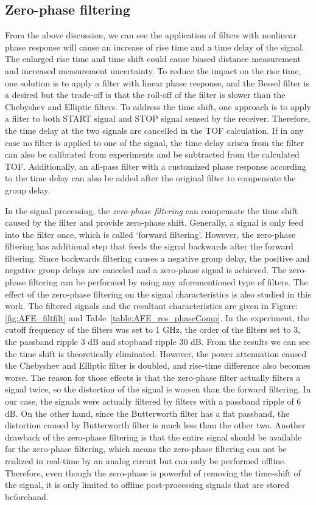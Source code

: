 \subsection{Zero-phase filtering}
From the above discussion, we can see the application of filters with nonlinear phase response will cause an increase of rise time and a time delay of the signal. The enlarged rise time and time shift could cause biased distance measurement and increased measurement uncertainty. To reduce the impact on the rise time, one solution is to apply a filter with linear phase response, and the Bessel filter is a desired but the trade-off is that the roll-off of the filter is slower than the Chebyshev and Elliptic filters. To address the time shift, one approach is to apply a filter to both START signal and STOP signal sensed by the receiver. Therefore, the time delay at the two signals are cancelled in the TOF calculation. If in any case no filter is applied to one of the signal, the time delay arisen from the filter can also be calibrated from experiments and be subtracted from the calculated TOF. Additionally, an all-pass filter with a customized phase response according to the time delay can also be added after the original filter to compensate the group delay.\par
In the signal processing, the \emph{zero-phase filtering} can compensate the time shift caused by the filter and provide zero-phase shift. Generally, a signal is only feed into the filter once, which is called ‘forward filtering’. However, the zero-phase filtering has additional step that feeds the signal backwards after the forward filtering. Since backwards filtering causes a negative group delay, the positive and negative group delays are canceled and a zero-phase signal is achieved. The zero-phase filtering can be performed by using any aforementioned type of filters. The effect of the zero-phase filtering on the signal characteristics is also studied in this work. The filtered signals and the resultant characteristics are given in Figure:\ref{fig:AFE_filtfilt} and Table~\ref{table:AFE_res_phaseComp}. In the experiment, the cutoff frequency of the filters was set to 1 GHz, the order of the filters set to 3, the passband ripple 3 dB and stopband ripple 30 dB. From the results we can see the time shift is theoretically eliminated. However, the power attenuation caused the Chebyshev and Elliptic filter is doubled, and rise-time difference also becomes worse. The reason for those effects is that the zero-phase filter actually filters a signal twice, so the distortion of the signal is worsen than the forward filtering. In our case, the signals were actually filtered by filters with a passband ripple of 6 dB. On the other hand, since the Butterworth filter has a flat passband, the distortion caused by Butterworth filter is much less than the other two. Another drawback of the zero-phase filtering is that the entire signal should be available for the zero-phase filtering, which means the zero-phase filtering can not be realized in real-time by an analog circuit but can only be performed offline. Therefore, even though the zero-phase is powerful of removing the time-shift of the signal, it is only limited to offline post-processing signals that are stored beforehand. 
